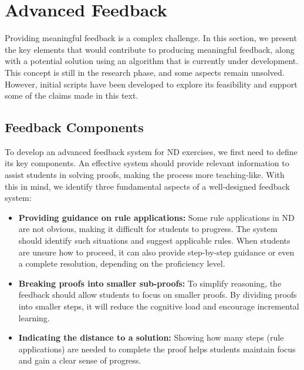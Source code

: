 %

\chapter{Advanced Feedback}
\label{chap:algo}

Providing meaningful feedback is a complex challenge. In this section, we present the key elements that would contribute to producing meaningful feedback, along with a potential solution using an algorithm that is currently under development. This concept is still in the research phase, and some aspects remain unsolved. However, initial scripts have been developed to explore its feasibility and support some of the claims made in this text. 

\section{Feedback Components}
To develop an advanced feedback system for \gls{ND} exercises, we first need to define its key components. An effective system should provide relevant information to assist students in solving proofs, making the process more teaching-like. With this in mind, we identify three fundamental aspects of a well-designed feedback system:

\begin{itemize}
    \item \textbf{Providing guidance on rule applications:} Some rule applications in \gls{ND} are not obvious, making it difficult for students to progress. The system should identify such situations and suggest applicable rules. When students are unsure how to proceed, it can also provide step-by-step guidance or even a complete resolution, depending on the proficiency level.
    
    \item \textbf{Breaking proofs into smaller sub-proofs:} To simplify reasoning, the feedback should allow students to focus on smaller proofs. By dividing proofs into smaller steps, it will reduce the cognitive load and encourage incremental learning.
    
    \item \textbf{Indicating the distance to a solution:} Showing how many steps (rule applications) are needed to complete the proof helps students maintain focus and gain a clear sense of progress.
\end{itemize}

